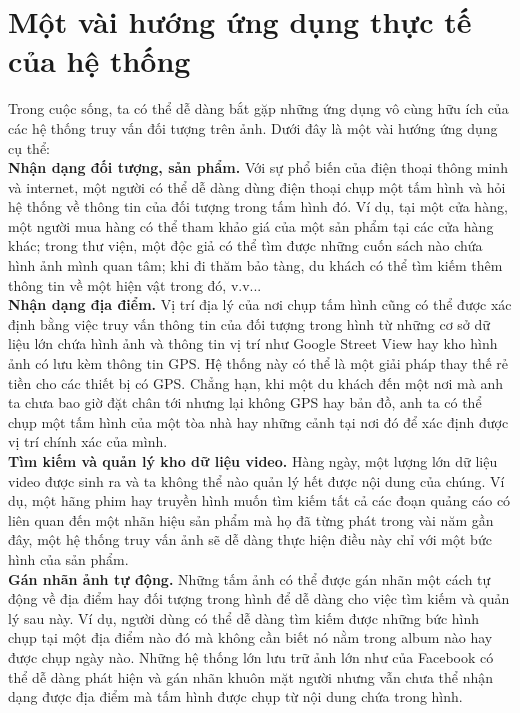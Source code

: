 \section{Một vài hướng ứng dụng thực tế của hệ thống}

Trong cuộc sống, ta có thể dễ dàng bắt gặp những ứng dụng vô cùng hữu ích của các hệ thống truy vấn đối tượng trên ảnh. Dưới đây là một vài hướng ứng dụng cụ thể:\\
\textbf{Nhận dạng đối tượng, sản phẩm.} Với sự phổ biến của điện thoại thông minh và internet, một người có thể dễ dàng dùng điện thoại chụp một tấm hình và hỏi hệ thống về thông tin của đối tượng trong tấm hình đó. Ví dụ, tại một cửa hàng, một người mua hàng có thể tham khảo giá của một sản phẩm tại các cửa hàng khác; trong thư viện, một độc giả có thể tìm được những cuốn sách nào chứa hình ảnh mình quan tâm; khi đi thăm bảo tàng, du khách có thể tìm kiếm thêm thông tin về một hiện vật trong đó, v.v...\\
\textbf{Nhận dạng địa điểm.} Vị trí địa lý của nơi chụp tấm hình cũng có thể được xác định bằng việc truy vấn thông tin của đối tượng trong hình từ những cơ sở dữ liệu lớn chứa hình ảnh và thông tin vị trí như Google Street View hay kho hình ảnh có lưu kèm thông tin GPS. Hệ thống này có thể là một giải pháp thay thế rẻ tiền cho các thiết bị có GPS. Chẳng hạn, khi một du khách đến một nơi mà anh ta chưa bao giờ đặt chân tới nhưng lại không GPS hay bản đồ, anh ta có thể chụp một tấm hình của một tòa nhà hay những cảnh tại nơi đó để xác định được vị trí chính xác của mình.\\
\textbf{Tìm kiếm và quản lý kho dữ liệu video.} Hàng ngày, một lượng lớn dữ liệu video được sinh ra và ta không thể nào quản lý hết được nội dung của chúng. Ví dụ, một hãng phim hay truyền hình muốn tìm kiếm tất cả các đoạn quảng cáo có liên quan đến một nhãn hiệu sản phẩm mà họ đã từng phát trong vài năm gần đây, một hệ thống truy vấn ảnh sẽ dễ dàng thực hiện điều này chỉ với một bức hình của sản phẩm.\\
\textbf{Gán nhãn ảnh tự động.} Những tấm ảnh có thể được gán nhãn một cách tự động về địa điểm hay đối tượng trong hình để dễ dàng cho việc tìm kiếm và quản lý sau này. Ví dụ, người dùng có thể dễ dàng tìm kiếm được những bức hình chụp tại một địa điểm nào đó mà không cần biết nó nằm trong album nào hay được chụp ngày nào. Những hệ thống lớn lưu trữ ảnh lớn như của Facebook có thể dễ dàng phát hiện và gán nhãn khuôn mặt người nhưng vẫn chưa thể nhận dạng được địa điểm mà tấm hình được chụp từ nội dung chứa trong hình.\\
